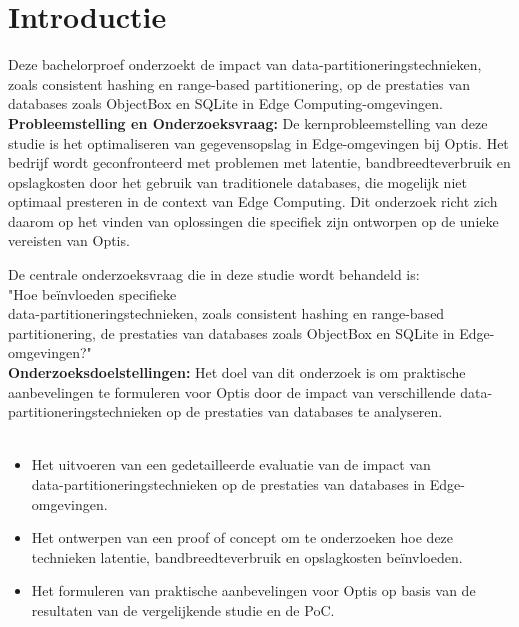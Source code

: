 
\section{Introductie}%
\label{sec:introductie}

Deze bachelorproef onderzoekt de impact van data-partitioneringstechnieken, zoals consistent hashing en range-based partitionering,
 op de prestaties van databases zoals ObjectBox en SQLite in Edge Computing-omgevingen. \\

\textbf{Probleemstelling en Onderzoeksvraag:}
 De kernprobleemstelling van deze studie is het optimaliseren van gegevensopslag in Edge-omgevingen bij Optis.
 Het bedrijf wordt geconfronteerd met problemen met latentie, bandbreedteverbruik en opslagkosten door het gebruik van traditionele databases, die mogelijk niet optimaal presteren in de context van Edge Computing. 
 Dit onderzoek richt zich daarom op het vinden van oplossingen die specifiek zijn ontworpen op de unieke vereisten van Optis.

De centrale onderzoeksvraag die in deze studie wordt behandeld is: \\
  "Hoe beïnvloeden specifieke \\ data-partitioneringstechnieken, zoals consistent hashing en range-based partitionering, de prestaties van databases zoals ObjectBox en SQLite in Edge-omgevingen?" \\
  
\textbf{Onderzoeksdoelstellingen:}
Het doel van dit onderzoek is om praktische aanbevelingen te formuleren voor Optis door de impact van verschillende data-partitioneringstechnieken op de prestaties van databases te analyseren. \\ \\
\begin{itemize}
  \item Het uitvoeren van een gedetailleerde evaluatie van de impact van \\ data-partitioneringstechnieken op de prestaties van databases in Edge-omgevingen.
  \item Het ontwerpen van een proof of concept om te onderzoeken hoe deze technieken latentie, bandbreedteverbruik en opslagkosten beïnvloeden.
  \item Het formuleren van praktische aanbevelingen voor Optis op basis van de resultaten van de vergelijkende studie en de PoC.\\
\end{itemize}

